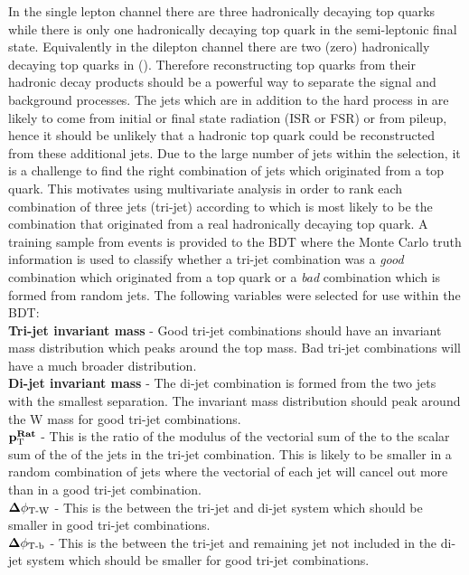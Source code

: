 In the \tttt single lepton channel there are three hadronically decaying top quarks while there is only one hadronically decaying top quark in the semi-leptonic \ttbar final state. Equivalently in the dilepton channel there are two (zero) hadronically decaying top quarks in \tttt (\ttbar). Therefore reconstructing top quarks from their hadronic decay products should be a powerful way to separate the signal and background processes. The jets which are in addition to the hard process in \ttbar are likely to come from initial or final state radiation (ISR or FSR) or from pileup, hence it should be unlikely that a hadronic top quark could be reconstructed from these additional jets. Due to the large number of jets within the selection, it is a challenge to find the right combination of jets which originated from a top quark. This motivates using multivariate analysis in order to rank each combination of three jets (tri-jet) according to which is most likely to be the combination that originated from a real hadronically decaying top quark.
A training sample from \ttbar events is provided to the BDT where the Monte Carlo truth information is used to classify whether a tri-jet combination was a \emph{good} combination which originated from a top quark or a \emph{bad} combination which is formed from random jets. The following variables were selected for use within the BDT:\\
\textbf{Tri-jet invariant mass} - Good tri-jet combinations should have an invariant mass distribution which peaks around the top mass.
Bad tri-jet combinations will have a much broader distribution. \\
\textbf{Di-jet invariant mass} - The di-jet combination is formed from the two jets with the smallest \DR separation. The invariant mass distribution should peak around the W mass for good tri-jet combinations.\\
$\mathbf{p_{\mathrm{T}}^{Rat}}$ - This is the ratio of the modulus of the vectorial sum of the \pt to the scalar sum of the \pt of the jets in the tri-jet combination. This is likely to be smaller in a random combination of jets where the vectorial \pt of each jet will cancel out more than in a good tri-jet combination.\\
$\mathbf{\Delta {\phi_{\textrm{T-W}}}}$ - This is the \Dphi between the tri-jet and di-jet system which should be smaller in good tri-jet combinations.\\
$\mathbf{\Delta {\phi_{\textrm{T-b}}}}$ - This is the \Dphi between the tri-jet and remaining jet not included in the di-jet system which should be smaller for good tri-jet combinations.\\
